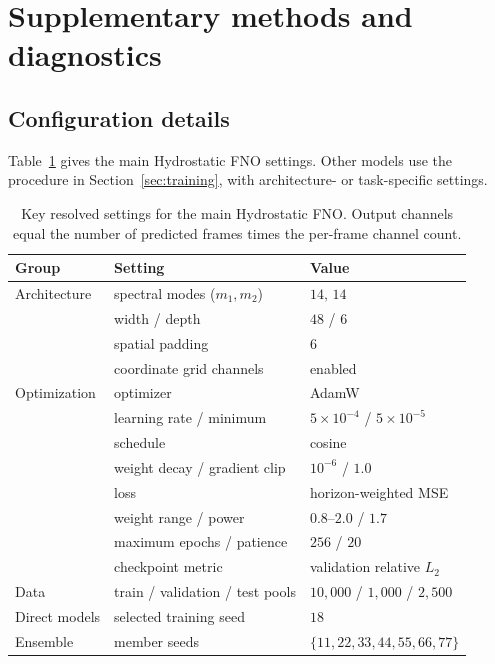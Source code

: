 \section{Supplementary methods and diagnostics}
\label{app:details}

\setcounter{equation}{0}
\setcounter{table}{0}
\setcounter{figure}{0}

\subsection{Configuration details}
\label{app:conf-details}

Table~\ref{tab:app-config} gives the main Hydrostatic FNO settings. Other models use the procedure in Section~\ref{sec:training}, with architecture- or task-specific settings.

\begin{table}[pos=!htbp]
\centering
\caption{Key resolved settings for the main Hydrostatic FNO. Output channels equal the number of predicted frames times the per-frame channel count.}
\label{tab:app-config}
\begin{tabular}{lll}
    \toprule
    Group & Setting & Value \\
    \midrule
    Architecture & spectral modes ($m_1, m_2$) & $14,\,14$ \\
                 & width / depth & $48$ / $6$ \\
                 & spatial padding & $6$ \\
                 & coordinate grid channels & enabled \\
    \midrule
    Optimization & optimizer & AdamW \\
                 & learning rate / minimum & $5\times10^{-4}$ / $5\times10^{-5}$ \\
                 & schedule & cosine \\
                 & weight decay / gradient clip & $10^{-6}$ / $1.0$ \\
                 & loss & horizon-weighted MSE \\
                 & weight range / power & $0.8$--$2.0$ / $1.7$ \\
                 & maximum epochs / patience & $256$ / $20$ \\
                 & checkpoint metric & validation relative $L_2$ \\
    \midrule
    Data         & train / validation / test pools & $10{,}000$ / $1{,}000$ / $2{,}500$ \\
    Direct models & selected training seed & $18$ \\
    Ensemble     & member seeds & $\{11,22,33,44,55,66,77\}$ \\
    \bottomrule
\end{tabular}
\end{table}


